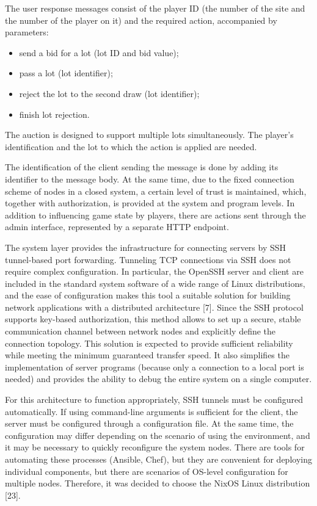 \documentclass[
]{ceurart}
\begin{document}
The user response messages consist of the player ID (the number of the site and the number of the player on it) and the required action, accompanied by parameters:
\begin{itemize}
\item  send a bid for a lot (lot ID and bid value);
\item  pass a lot (lot identifier);
\item  reject the lot to the second draw (lot identifier);
\item  finish lot rejection.
\end{itemize}
The auction is designed to support multiple lots simultaneously.  The player's identification and the lot to which the action is applied are needed.

The identification of the client sending the message is done by adding its identifier to the message body. At the same time, due to the fixed connection scheme of nodes in a closed system, a certain level of trust is maintained, which, together with authorization, is provided at the system and program levels. In addition to influencing game state by players, there are actions sent through the admin interface, represented by a separate HTTP endpoint.

The system layer provides the infrastructure for connecting servers by SSH tunnel-based port forwarding. Tunneling TCP connections via SSH does not require complex configuration. In particular, the OpenSSH server and client are included in the standard system software of a wide range of Linux distributions, and the ease of configuration makes this tool a suitable solution for building network applications with a distributed architecture [7]. Since the SSH protocol supports key-based authorization, this method allows to set up a secure, stable communication channel between network nodes and explicitly define the connection topology. This solution is expected to provide sufficient reliability while meeting the minimum guaranteed transfer speed. It also simplifies the implementation of server programs (because only a connection to a local port is needed) and provides the ability to debug the entire system on a single computer.

For this architecture to function appropriately, SSH tunnels must be configured automatically. If using command-line arguments is sufficient for the client, the server must be configured through a configuration file. At the same time, the configuration may differ depending on the scenario of using the environment, and it may be necessary to quickly reconfigure the system nodes. There are tools for automating these processes (Ansible, Chef), but they are convenient for deploying individual components, but there are scenarios of OS-level configuration for multiple nodes. Therefore, it was decided to choose the NixOS Linux distribution [23].
\end{document}
